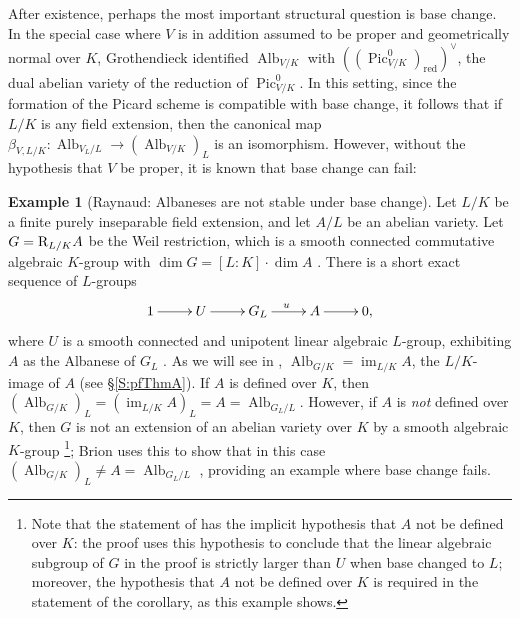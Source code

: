 \documentclass[11pt, reqno]{amsart}
\numberwithin{equation}{section}
\theoremstyle{definition}
\newtheorem{exa}[teo]{Example}
\theoremstyle{remark}
\def\res{{\bf\rm R}}
\DeclareMathOperator{\im}{im}
\DeclareMathOperator{\alb}{Alb}
\begin{document}
After existence, perhaps the most important structural question is  base change.
In the special case where $V$ is in addition assumed to be  proper and geometrically normal  over $K$, Grothendieck  \cite{FGA} 
identified $\alb_{V/K}$ with
$((\operatorname{Pic}^0_{V/K})_{\operatorname{red}})^\vee$, the dual abelian variety of the reduction of $\operatorname{Pic}^0_{V/K}$.  In this
setting, since the formation of the Picard scheme is compatible with
base change, it follows that if $L/K$ is any field extension, then the
canonical map $\beta_{V,L/K}:\alb_{V_L/L} \to (\alb_{V/K})_L$ is an
isomorphism. 
However, without the hypothesis that $V$ be proper, it is known that base change can fail:





\begin{exa}[Raynaud: Albaneses are not stable under base change]
  \label{E:badbc}
  Let $L/K$ be a finite purely inseparable field extension, and let  $A/L$ be an 
  abelian variety.   
      Let $G =
  \res_{L/K}A$ be the Weil restriction, which is a smooth  connected commutative algebraic
  $K$-group with  $\dim G= [L:K]\cdot \dim A$    \cite[Exp.~XVII, App.~II, Prop.~5.1]{SGA32}.  
 There is a short exact sequence of $L$-groups 
   \cite[Exp.~XVII, App.~II, Prop.~5.1]{SGA32}
 $$
 \xymatrix{1\ar[r]& U\ar[r]& G_L\ar[r]^u&A\ar[r]& 0,}
 $$  where $U$ is a smooth connected and unipotent linear algebraic $L$-group, 
 exhibiting $A$ as the Albanese of $G_L$  \cite[Ex.~4.2.7]{brionstructure}.  
   As we will see in ,   $\operatorname{Alb}_{G/K}=\im_{L/K} A$, the $L/K$-image of $A$ (see \S \ref{S:pfThmA}).  
 If $A$ is defined over $K$,   then $(\operatorname{Alb}_{G/K})_L=(\im_{L/K} A)_L=A=\operatorname{Alb}_{G_L/L}$.  However, if $A$ is \emph{not} defined over $K$, then $G$ is not an extension of an abelian variety over $K$ by a smooth algebraic $K$-group   
 \cite[Exp.~XVII, App.~II, Cor.(ii)~to~Prop.~5.1]{SGA32} \footnote{Note that the statement of  \cite[Exp.~XVII, App.~II, Cor.(ii)~to~Prop.~5.1]{SGA32} has the implicit hypothesis that $A$ not be defined over $K$: the proof uses this hypothesis to conclude that the linear algebraic subgroup  of $G$ in the proof is strictly larger than $U$ when base changed to $L$; moreover, the hypothesis that $A$ not be defined over $K$ is required in the statement of the corollary, as this example shows.}; Brion uses this to show that in this case $(\operatorname{Alb}_{G/K})_L   \ne A = \operatorname{Alb}_{G_L/L}$  \cite[Ex.~4.2.7]{brionstructure},
   providing an example where base change fails.     
\end{exa}
\end{document}
